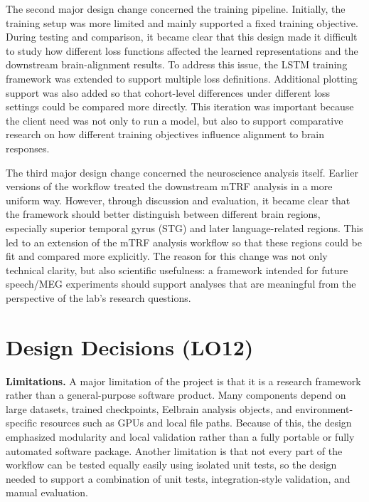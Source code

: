 \documentclass{article}
\begin{document}
The second major design change concerned the training pipeline.
Initially, the training setup was more limited and mainly supported a fixed training objective.
During testing and comparison, it became clear that this design made it difficult to study how different loss functions affected the learned representations and the downstream brain-alignment results.
To address this issue, the LSTM training framework was extended to support multiple loss definitions.
Additional plotting support was also added so that cohort-level differences under different loss settings could be compared more directly.
This iteration was important because the client need was not only to run a model, but also to support comparative research on how different training objectives influence alignment to brain responses.

The third major design change concerned the neuroscience analysis itself.
Earlier versions of the workflow treated the downstream mTRF analysis in a more uniform way.
However, through discussion and evaluation, it became clear that the framework should better distinguish between different brain regions, especially superior temporal gyrus (STG) and later language-related regions.
This led to an extension of the mTRF analysis workflow so that these regions could be fit and compared more explicitly.
The reason for this change was not only technical clarity, but also scientific usefulness: a framework intended for future speech/MEG experiments should support analyses that are meaningful from the perspective of the lab's research questions.


















\section{Design Decisions (LO12)}



\textbf{Limitations.}
A major limitation of the project is that it is a research framework rather than a general-purpose software product.
Many components depend on large datasets, trained checkpoints, Eelbrain analysis objects, and environment-specific resources such as GPUs and local file paths.
Because of this, the design emphasized modularity and local validation rather than a fully portable or fully automated software package.
Another limitation is that not every part of the workflow can be tested equally easily using isolated unit tests, so the design needed to support a combination of unit tests, integration-style validation, and manual evaluation.
\end{document}
